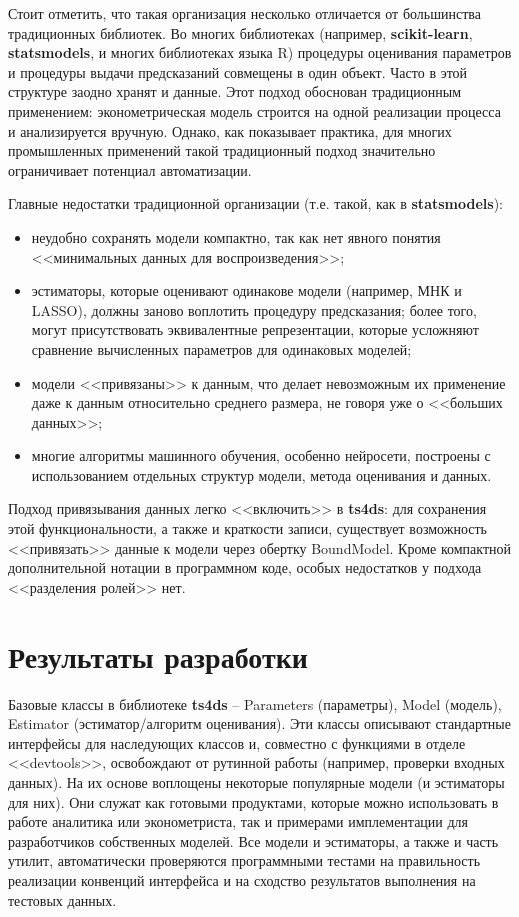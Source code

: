 \documentclass[a4paper,14pt]{extreport}
\begin{document}
	Стоит отметить, что такая организация несколько отличается от большинства традиционных библиотек. Во многих библиотеках (например, \textbf{scikit-learn}, \textbf{statsmodels}\cite{statsmodels}, и многих библиотеках языка R) процедуры оценивания параметров и процедуры выдачи предсказаний совмещены в один объект. Часто в этой структуре заодно хранят и данные. Этот подход обоснован традиционным применением: эконометрическая модель строится на одной  реализации процесса и анализируется вручную. Однако, как показывает практика, для многих промышленных применений такой традиционный подход значительно ограничивает потенциал автоматизации. 
	
	Главные недостатки традиционной организации (т.е. такой, как в \textbf{statsmodels}):
	
	\begin{itemize}
		\item неудобно сохранять модели компактно, так как нет явного понятия <<минимальных данных для воспроизведения>>;
		\item эстиматоры, которые оценивают одинакове модели (например, МНК и LASSO), должны заново воплотить процедуру предсказания; более того, могут присутствовать эквивалентные репрезентации, которые усложняют сравнение вычисленных параметров для одинаковых моделей;
		\item модели <<привязаны>> к данным, что делает невозможным их применение даже к данным относительно среднего размера, не говоря уже о <<больших данных>>;
		\item многие алгоритмы машинного обучения, особенно нейросети, построены с использованием отдельных структур модели, метода оценивания и данных.
	\end{itemize}
	
	Подход привязывания данных легко <<включить>> в \textbf{ts4ds}: для сохранения этой функциональности, а также и краткости записи, существует возможность <<привязать>> данные к модели через обертку BoundModel. Кроме компактной дополнительной нотации в программном коде, особых недостатков у подхода <<разделения ролей>> нет.
	
	\section{Результаты разработки}
	
	Базовые классы в библиотеке \textbf{ts4ds} -- Parameters (параметры), Model (модель), Estimator (эстиматор/алгоритм оценивания). Эти классы описывают стандартные интерфейсы для наследующих классов и, совместно с функциями в отделе <<devtools>>, освобождают от рутинной работы (например, проверки входных данных). На их основе воплощены некоторые популярные модели (и эстиматоры для них). Они служат как готовыми продуктами, которые можно использовать в работе аналитика или эконометриста, так и примерами имплементации для разработчиков собственных моделей. Все модели и эстиматоры, а также и часть утилит, автоматически проверяются программными тестами на правильность реализации конвенций интерфейса и на сходство результатов выполнения на тестовых данных.
	
\end{document}
